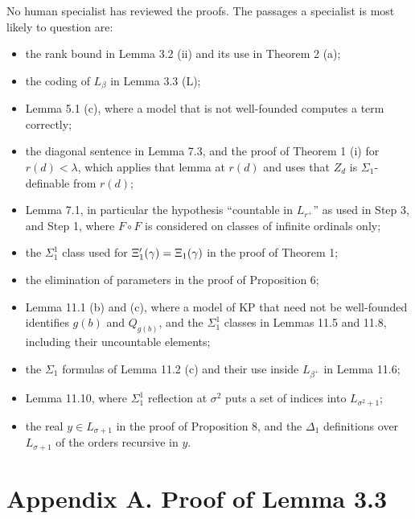 \documentclass[11pt]{article}
\begin{document}
No human specialist has reviewed the proofs. The passages a specialist is most likely to question are:
\begin{itemize}
\item the rank bound in Lemma 3.2 (ii) and its use in Theorem 2 (a);
\item the coding of $L_{\beta}$ in Lemma 3.3 (L);
\item Lemma 5.1 (c), where a model that is not well-founded computes a term correctly;
\item the diagonal sentence in Lemma 7.3, and the proof of Theorem 1 (i) for $r(d) < \lambda$, which applies that lemma
  at $r(d)$ and uses that $Z_d$ is $\Sigma_1$-definable from $r(d)$;
\item Lemma 7.1, in particular the hypothesis ``countable in $L_{r^+}$'' as used in Step 3, and Step 1, where
  $F \circ F$ is considered on classes of infinite ordinals only;
\item the $\Sigma^1_1$ class used for $\Xi'_1(\gamma) = \Xi_1(\gamma)$ in the proof of Theorem 1;
\item the elimination of parameters in the proof of Proposition 6;
\item Lemma 11.1 (b) and (c), where a model of KP that need not be well-founded identifies $g(b)$ and $Q_{g(b)}$,
  and the $\Sigma^1_1$ classes in Lemmas 11.5 and 11.8, including their uncountable elements;
\item the $\Sigma_1$ formulas of Lemma 11.2 (c) and their use inside $L_{\beta^+}$ in Lemma 11.6;
\item Lemma 11.10, where $\Sigma^1_1$ reflection at $\sigma^2$ puts a set of indices into $L_{\sigma^2 + 1}$;
\item the real $y \in L_{\sigma + 1}$ in the proof of Proposition 8, and the $\Delta_1$ definitions over
  $L_{\sigma + 1}$ of the orders recursive in $y$.
\end{itemize}

\section*{Appendix A. Proof of Lemma 3.3}
\end{document}
